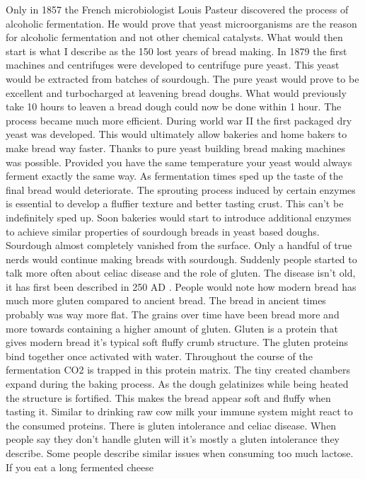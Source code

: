 Only in 1857 the French microbiologist Louis Pasteur discovered
the process of alcoholic fermentation. He would prove that
yeast microorganisms are the reason for alcoholic fermentation
and not other chemical catalysts. What would then start is
what I describe as the 150 lost years of bread making. In 1879
the first machines and centrifuges were developed to centrifuge
pure yeast. This yeast would be extracted from batches of sourdough.
The pure yeast would prove to be excellent and turbocharged
at leavening bread doughs. What would previously take 10 hours
to leaven a bread dough could now be done within 1 hour.
The process became much more efficient. During world war II
the first packaged dry yeast was developed. This would ultimately
allow bakeries and home bakers to make bread way faster.
Thanks to pure yeast building bread making machines was
possible. Provided you have the same temperature your yeast
would always ferment exactly the same way. As fermentation
times sped up the taste of the final bread would deteriorate.
The sprouting process induced by certain enzymes is essential
to develop a fluffier texture and better tasting crust. This
can't be indefinitely sped up. Soon bakeries would start
to introduce additional enzymes to achieve similar properties
of sourdough breads in yeast based doughs. Sourdough almost
completely vanished from the surface. Only a handful
of true nerds would continue making breads with sourdough.
Suddenly people started to talk more often about celiac disease
and the role of gluten. The disease isn't old, it has first
been described in 250 AD \cite{coeliac+disease}. People
would note how modern bread has much more gluten compared
to ancient bread. The bread in ancient times probably was way more flat.
The grains over time have been bread more and more towards containing a higher
amount of gluten. Gluten is a protein that gives modern
bread it's typical soft fluffy crumb structure. The
gluten proteins bind together once activated with water.
Throughout the course of the fermentation CO2 is trapped
in this protein matrix. The tiny created chambers expand
during the baking process. As the dough gelatinizes while
being heated the structure is fortified. This makes the bread appear
soft and fluffy when tasting it. Similar to drinking
raw cow milk your immune system might react to
the consumed proteins. There is gluten intolerance
and celiac disease. When people say they don't handle
gluten will it's mostly a gluten intolerance they describe.
Some people describe similar issues when consuming
too much lactose. If you eat a long fermented cheese
